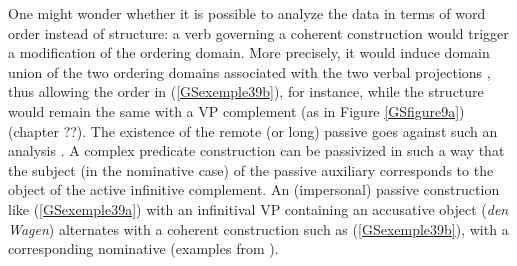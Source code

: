 \documentclass[output=paper]{langsci/langscibook}
\begin{document}
{One might wonder whether it is possible to analyze the data in terms of word order instead of structure: a verb governing a coherent construction would trigger a modification of the ordering domain. More precisely, it would induce domain union of the two ordering domains associated with the two verbal projections \citep{reape1994domain}, thus allowing the order in (\ref{GSexemple39b}), for instance, while the structure would remain the same with a VP complement (as in Figure \ref{GSfigure9a}) (chapter ??). The existence of the remote (or long) passive goes against such an analysis \citep{HN94a-ohne-crossref, Kathol98b, Mueller2002b}. A complex predicate construction can be passivized in such a way that the subject (in the nominative case) of the passive auxiliary corresponds to the object of the active infinitive complement. An (impersonal) passive construction like (\ref{GSexemple39a}) with an infinitival VP containing an accusative object (\textit{den Wagen}) alternates with a coherent construction such as (\ref{GSexemple39b}), with a corresponding nominative (examples from \citealt{Mueller2002b}). 

\begin{exe}
	\ex \label{GSexemple39} 
	\begin{xlist}
        \label{GSexemple39a}

        \label{GSexemple39b}

		\label{GSexemple39c}	
		
		\label{GSexemple39d}
		
		\end{xlist}
\end{exe}

}
\end{document}
